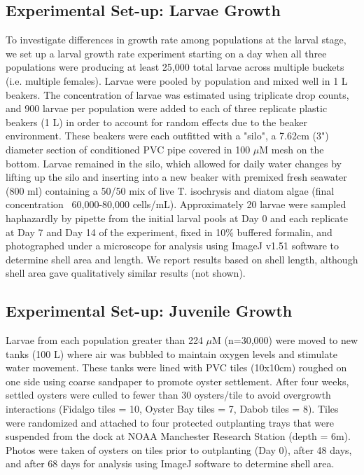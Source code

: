 \documentclass[10pt,letterpaper]{article}
\begin{document}
\subsection*{Experimental Set-up: Larvae Growth}
To investigate differences in growth rate among populations at the larval stage, we set up a larval growth rate experiment starting on a day when all three populations were producing at least 25,000 total larvae across multiple buckets (i.e. multiple females). Larvae were pooled by population and mixed well in 1 L beakers. The concentration of larvae was estimated using triplicate drop counts, and 900 larvae per population were added to each of three replicate plastic beakers (1 L) in order to account for random effects due to the beaker environment. These beakers were each outfitted with a "silo", a 7.62cm (3") diameter section of conditioned PVC pipe covered in 100 $\mu$M mesh on the bottom. Larvae remained in the silo, which allowed for daily water changes by lifting up the silo and inserting into a new beaker with premixed fresh seawater (800 ml) containing a 50/50 mix of live T. isochrysis and diatom algae (final concentration ~60,000-80,000 cells/mL). Approximately 20 larvae were sampled haphazardly by pipette from the initial larval pools at Day 0 and each replicate at Day 7 and Day 14 of the experiment, fixed in 10\% buffered formalin, and photographed under a microscope for analysis using ImageJ v1.51\cite{Schneider2012-js} software to determine shell area and length. We report results based on shell length, although shell area gave qualitatively similar results (not shown).

\subsection*{Experimental Set-up: Juvenile Growth}
Larvae from each population greater than 224 $\mu$M (n=30,000) were moved to new tanks (100 L) where air was bubbled to maintain oxygen levels and stimulate water movement. These tanks were lined with PVC tiles (10x10cm) roughed on one side using coarse sandpaper to promote oyster settlement. After four weeks, settled oysters were culled to fewer than 30 oysters/tile to avoid overgrowth interactions (Fidalgo tiles = 10, Oyster Bay tiles = 7, Dabob tiles = 8). Tiles were randomized and attached to four protected outplanting trays that were suspended from the dock at NOAA Manchester Research Station (depth = 6m). Photos were taken of oysters on tiles prior to outplanting (Day 0), after 48 days, and after 68 days for analysis using ImageJ software to determine shell area. 
\end{document}
